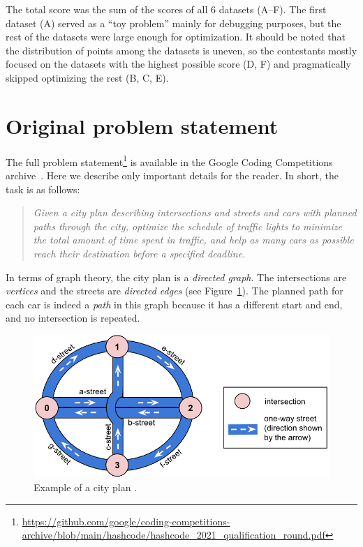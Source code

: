 The total score was the sum of the scores of all 6 datasets (A--F). The first dataset (A) served as a ``toy problem'' mainly for debugging purposes, but the rest of the datasets were large enough for optimization. It should be noted that the distribution of points among the datasets is uneven, so the contestants mostly focused on the datasets with the highest possible score (D, F) and pragmatically skipped optimizing the rest (B, C, E).

\section{Original problem statement} \label{sec:original_problem_statement}

The full problem statement\footnote{\url{https://github.com/google/coding-competitions-archive/blob/main/hashcode/hashcode_2021_qualification_round.pdf}} is available in the Google Coding Competitions archive~\cite{google2023google}. Here we describe only important details for the reader.
In short, the task is as follows:
\begin{quote}
    \textit{Given a city plan describing intersections and streets and cars with planned paths through the city, optimize the schedule of traffic lights to minimize the total amount of time spent in traffic, and help as many cars as possible reach their destination before a specified deadline.}
\end{quote}
In terms of graph theory, the city plan is a \textit{directed graph}. The intersections are \textit{vertices} and the streets are \textit{directed edges} (see Figure~\ref{fig:hashcode_city_plan}). The planned path for each car is indeed a \textit{path} in this graph because it has a different start and end, and no intersection is repeated.

\begin{figure}
    \centering
    \includegraphics[width=\linewidth]{img/hashcode/figure1.png}
    \caption[Example of a city plan]{
        Example of a city plan \cite{google2023google}.
    }
    \label{fig:hashcode_city_plan}
\end{figure}

